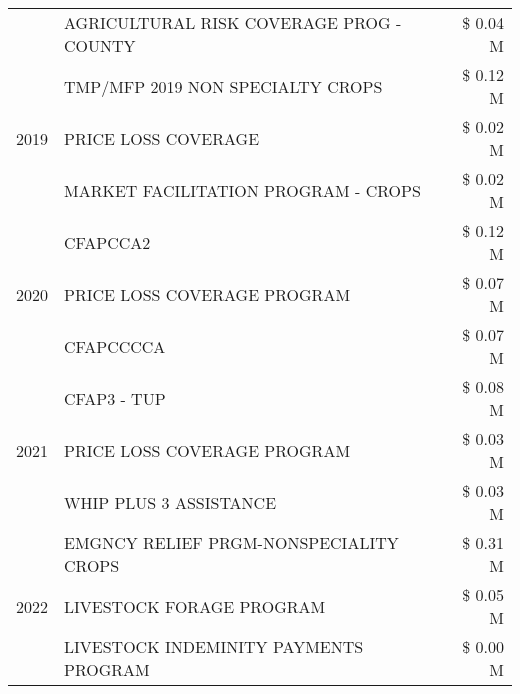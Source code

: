 \begin{tabular}{llr}
 & AGRICULTURAL RISK COVERAGE PROG - COUNTY & \$ 0.04 M \\
\cline{1-3}
\multirow[t]{3}{*}{2019} & TMP/MFP 2019 NON SPECIALTY CROPS & \$ 0.12 M \\
 & PRICE LOSS COVERAGE & \$ 0.02 M \\
 & MARKET FACILITATION PROGRAM - CROPS & \$ 0.02 M \\
\cline{1-3}
\multirow[t]{3}{*}{2020} & CFAPCCA2 & \$ 0.12 M \\
 & PRICE LOSS COVERAGE PROGRAM & \$ 0.07 M \\
 & CFAPCCCCA & \$ 0.07 M \\
\cline{1-3}
\multirow[t]{3}{*}{2021} & CFAP3 - TUP & \$ 0.08 M \\
 & PRICE LOSS COVERAGE PROGRAM & \$ 0.03 M \\
 & WHIP PLUS 3 ASSISTANCE & \$ 0.03 M \\
\cline{1-3}
\multirow[t]{3}{*}{2022} & EMGNCY RELIEF PRGM-NONSPECIALITY CROPS & \$ 0.31 M \\
 & LIVESTOCK FORAGE PROGRAM & \$ 0.05 M \\
 & LIVESTOCK INDEMINITY PAYMENTS PROGRAM & \$ 0.00 M \\
\cline{1-3}
\bottomrule
\end{tabular}
